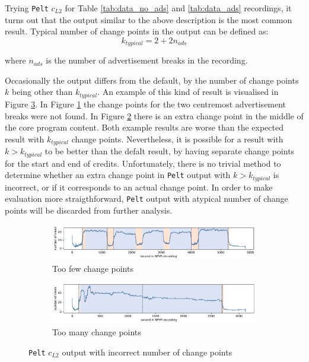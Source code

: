Trying \texttt{Pelt} $c_{L2}$ for Table \ref{tab:data_no_ads} and \ref{tab:data_ads} recordings, it turns out that the output similar to the above description is the most common result. Typical number of change points in the output can be defined as:
\begin{equation}
    k_{typical}=2+2n_{ads}
    \label{eq:k_typical}
\end{equation}

where $n_{ads}$ is the number of advertisement breaks in the recording.

Occasionally the output differs from the default, by the number of change points $k$ being other than $k_{typical}$. An example of this kind of result is visualised in Figure \ref{fig:ruptures_wrong_k}. In Figure \ref{fig:pelt_too_few} the change points for the two centremost advertisement breaks were not found. In Figure \ref{fig:pelt_too_many} there is an extra change point in the middle of the core program content. Both example results are worse than the expected result with $k_{typical}$ change points. Nevertheless, it is possible for a result with $k > k_{typical}$ to be better than the defalt result, by having separate change points for the start and end of credits. Unfortunately, there is no trivial method to determine whether an extra change point in \texttt{Pelt} output with $k > k_{typical}$ is incorrect, or if it corresponds to an actual change point. In order to make evaluation more straigthforward, \texttt{Pelt} output with atypical number of change points will be discarded from further analysis.

\begin{figure}[H]
    \centering
    \begin{subfigure}[b]{\textwidth}
       \includegraphics[width=1\textwidth]{../plots/too_few_k.pdf}
       \caption{Too few change points}
       \label{fig:pelt_too_few} 
    \end{subfigure}
    \par\bigskip
    \begin{subfigure}[b]{\textwidth}
       \includegraphics[width=1\textwidth]{../plots/too_many_k.pdf}
       \caption{Too many change points}
       \label{fig:pelt_too_many}
    \end{subfigure}
    \caption{\texttt{Pelt} $c_{L2}$ output with incorrect number of change points}
    \label{fig:ruptures_wrong_k}
\end{figure} 

